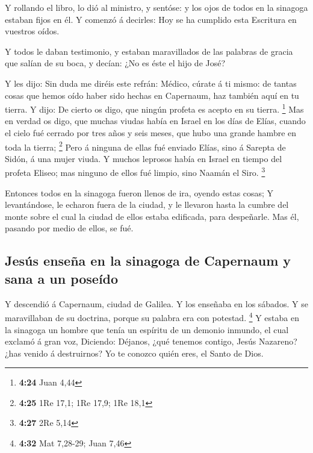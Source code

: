  Y rollando el libro, lo dió al ministro, y sentóse: y
los ojos de todos en la sinagoga estaban fijos en él.  Y
comenzó á decirles: Hoy se ha cumplido esta Escritura en vuestros oídos.

 Y todos le daban testimonio, y estaban maravillados de
las palabras de gracia que salían de su boca, y decían: ¿No es éste el
hijo de José?

 Y les dijo: Sin duda me diréis este refrán: Médico,
cúrate á ti mismo: de tantas cosas que hemos oído haber sido hechas en
Capernaum, haz también aquí en tu tierra.  Y dijo: De
cierto os digo, que ningún profeta es acepto en su tierra. \footnote{\textbf{4:24}
  Juan 4,44}  Mas en verdad os digo, que muchas viudas
había en Israel en los días de Elías, cuando el cielo fué cerrado por
tres años y seis meses, que hubo una grande hambre en toda la tierra;
\footnote{\textbf{4:25} 1Re 17,1; 1Re 17,9; 1Re 18,1} 
Pero á ninguna de ellas fué enviado Elías, sino á Sarepta de Sidón, á
una mujer viuda.  Y muchos leprosos había en Israel en
tiempo del profeta Eliseo; mas ninguno de ellos fué limpio, sino Naamán
el Siro. \footnote{\textbf{4:27} 2Re 5,14}

 Entonces todos en la sinagoga fueron llenos de ira,
oyendo estas cosas;  Y levantándose, le echaron fuera de
la ciudad, y le llevaron hasta la cumbre del monte sobre el cual la
ciudad de ellos estaba edificada, para despeñarle.  Mas
él, pasando por medio de ellos, se fué.

\hypertarget{jesuxfas-enseuxf1a-en-la-sinagoga-de-capernaum-y-sana-a-un-poseuxeddo}{%
\subsection{Jesús enseña en la sinagoga de Capernaum y sana a un
poseído}\label{jesuxfas-enseuxf1a-en-la-sinagoga-de-capernaum-y-sana-a-un-poseuxeddo}}

 Y descendió á Capernaum, ciudad de Galilea. Y los
enseñaba en los sábados.  Y se maravillaban de su
doctrina, porque su palabra era con potestad. \footnote{\textbf{4:32}
  Mat 7,28-29; Juan 7,46}  Y estaba en la sinagoga un
hombre que tenía un espíritu de un demonio inmundo, el cual exclamó á
gran voz,  Diciendo: Déjanos, ¿qué tenemos contigo, Jesús
Nazareno? ¿has venido á destruirnos? Yo te conozco quién eres, el Santo
de Dios.

